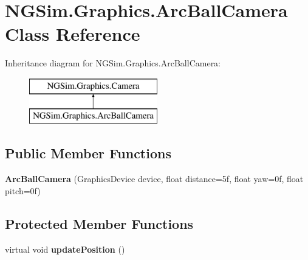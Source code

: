 \hypertarget{class_n_g_sim_1_1_graphics_1_1_arc_ball_camera}{}\section{N\+G\+Sim.\+Graphics.\+Arc\+Ball\+Camera Class Reference}
\label{class_n_g_sim_1_1_graphics_1_1_arc_ball_camera}
Inheritance diagram for N\+G\+Sim.\+Graphics.\+Arc\+Ball\+Camera\+:\begin{figure}[H]
\begin{center}
\leavevmode
\includegraphics[height=2.000000cm]{class_n_g_sim_1_1_graphics_1_1_arc_ball_camera}
\end{center}
\end{figure}
\subsection*{Public Member Functions}
\begin{DoxyCompactItemize}
\item 
\mbox{\label{class_n_g_sim_1_1_graphics_1_1_arc_ball_camera_a1b2ce9c6cd3c39a9d02eab87b09117b2}} 
{\bfseries Arc\+Ball\+Camera} (Graphics\+Device device, float distance=5f, float yaw=0f, float pitch=0f)
\end{DoxyCompactItemize}
\subsection*{Protected Member Functions}
\begin{DoxyCompactItemize}
\item 
\mbox{\label{class_n_g_sim_1_1_graphics_1_1_arc_ball_camera_a0f56f5684ab1c2dd2c9c183e17b2c5d9}} 
virtual void {\bfseries update\+Position} ()
\end{DoxyCompactItemize}
